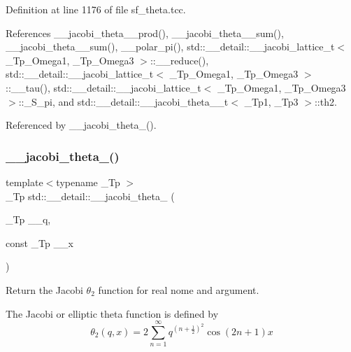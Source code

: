 Definition at line 1176 of file sf\+\_\+theta.\+tcc.



References \+\_\+\+\_\+jacobi\+\_\+theta\+\_\+\_\+prod(), \+\_\+\+\_\+jacobi\+\_\+theta\+\_\+\_\+sum(), \+\_\+\+\_\+jacobi\+\_\+theta\+\_\+\_\+sum(), \+\_\+\+\_\+polar\+\_\+pi(), std\+::\+\_\+\+\_\+detail\+::\+\_\+\+\_\+jacobi\+\_\+lattice\+\_\+t$<$ \+\_\+\+Tp\+\_\+\+Omega1, \+\_\+\+Tp\+\_\+\+Omega3 $>$\+::\+\_\+\+\_\+reduce(), std\+::\+\_\+\+\_\+detail\+::\+\_\+\+\_\+jacobi\+\_\+lattice\+\_\+t$<$ \+\_\+\+Tp\+\_\+\+Omega1, \+\_\+\+Tp\+\_\+\+Omega3 $>$\+::\+\_\+\+\_\+tau(), std\+::\+\_\+\+\_\+detail\+::\+\_\+\+\_\+jacobi\+\_\+lattice\+\_\+t$<$ \+\_\+\+Tp\+\_\+\+Omega1, \+\_\+\+Tp\+\_\+\+Omega3 $>$\+::\+\_\+\+S\+\_\+pi, and std\+::\+\_\+\+\_\+detail\+::\+\_\+\+\_\+jacobi\+\_\+theta\+\_\+\_\+t$<$ \+\_\+\+Tp1, \+\_\+\+Tp3 $>$\+::th2.



Referenced by \+\_\+\+\_\+jacobi\+\_\+theta\+\_().

\mbox{\label{namespacestd_1_1____detail_a5aace3bea7c88443d5bceb503a0452d0}} 
\subsubsection{\texorpdfstring{\+\_\+\+\_\+jacobi\+\_\+theta\+\_()}{\_\_jacobi\_theta\_2()}\hspace{0.1cm}{\footnotesize\ttfamily [2/2]}}
{\footnotesize\ttfamily template$<$typename \+\_\+\+Tp $>$ \\
\+\_\+\+Tp std\+::\+\_\+\+\_\+detail\+::\+\_\+\+\_\+jacobi\+\_\+theta\+\_ (\begin{DoxyParamCaption}\item[{\+\_\+\+Tp}]{\+\_\+\+\_\+q,  }\item[{const \+\_\+\+Tp}]{\+\_\+\+\_\+x }\end{DoxyParamCaption})}

Return the Jacobi $ \theta_2 $ function for real nome and argument.

The Jacobi or elliptic theta function is defined by \[ \theta_2(q,x) = 2\sum_{n=1}^{\infty} q^{(n+\frac{1}{2})^2}\cos{(2n+1)x} \]


